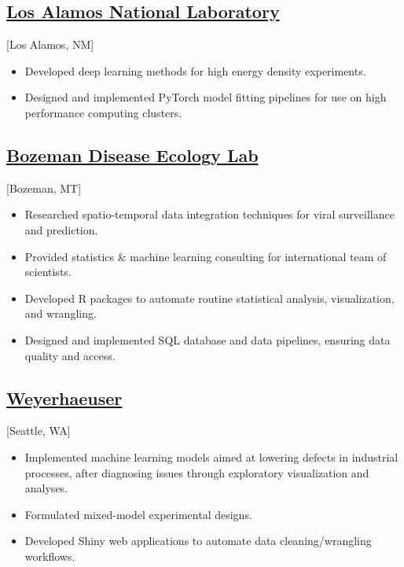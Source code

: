 \documentclass{wm_cv}
\begin{document}
\subsection{\href{https://cnls.lanl.gov}{Los Alamos National Laboratory}}[Los Alamos, NM]
\begin{positions}
\end{positions}
\begin{itemize}
  \item Developed deep learning methods for high energy density experiments.
  \item Designed and implemented PyTorch model fitting pipelines for use on high performance computing clusters.
\end{itemize}

\subsection{\href{http://bzndiseaselab.org/}{Bozeman Disease Ecology Lab}}[Bozeman, MT]
\begin{positions}
\end{positions}

\begin{itemize}
  \item Researched spatio-temporal data integration techniques for viral surveillance and prediction.
  \item Provided statistics \& machine learning consulting for international team of scientists.
  \item Developed R packages to automate routine statistical analysis, visualization, and wrangling.
  \item Designed and implemented SQL database and data pipelines, ensuring data quality and access.
\end{itemize}


\subsection{\href{https://en.wikipedia.org/wiki/Weyerhaeuser}{Weyerhaeuser}}[Seattle, WA]
\begin{positions}
\end{positions}

\begin{itemize}
  \item Implemented machine learning models aimed at lowering defects in industrial processes, after diagnosing issues through exploratory visualization and analyses.
  \item Formulated mixed-model experimental designs.
  \item Developed Shiny web applications to automate data cleaning/wrangling workflows.
\end{itemize} 
\end{document}
